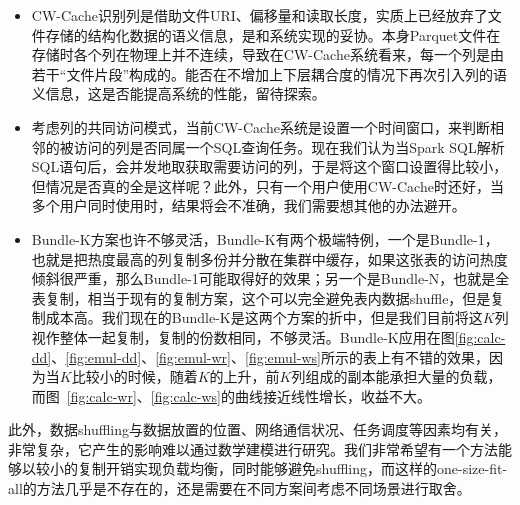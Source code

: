 \begin{itemize}
    \item CW-Cache识别列是借助文件URI、偏移量和读取长度，实质上已经放弃了文件存储的结构化数据的语义信息，是和系统实现的妥协。本身Parquet文件在存储时各个列在物理上并不连续，导致在CW-Cache系统看来，每一个列是由若干“文件片段”构成的。能否在不增加上下层耦合度的情况下再次引入列的语义信息，这是否能提高系统的性能，留待探索。
    \item 考虑列的共同访问模式，当前CW-Cache系统是设置一个时间窗口，来判断相邻的被访问的列是否同属一个SQL查询任务。现在我们认为当Spark SQL解析SQL语句后，会并发地取获取需要访问的列，于是将这个窗口设置得比较小，但情况是否真的全是这样呢？此外，只有一个用户使用CW-Cache时还好，当多个用户同时使用时，结果将会不准确，我们需要想其他的办法避开。
    \item Bundle-K方案也许不够灵活，Bundle-K有两个极端特例，一个是Bundle-1，也就是把热度最高的列复制多份并分散在集群中缓存，如果这张表的访问热度倾斜很严重，那么Bundle-1可能取得好的效果；另一个是Bundle-N，也就是全表复制，相当于现有的复制方案，这个可以完全避免表内数据shuffle，但是复制成本高。我们现在的Bundle-K是这两个方案的折中，但是我们目前将这$K$列视作整体一起复制，复制的份数相同，不够灵活。Bundle-K应用在图\ref{fig:calc-dd}、\ref{fig:emul-dd}、\ref{fig:emul-wr}、\ref{fig:emul-ws}所示的表上有不错的效果，因为当$K$比较小的时候，随着$K$的上升，前$K$列组成的副本能承担大量的负载，而图~\ref{fig:calc-wr}、\ref{fig:calc-ws}的曲线接近线性增长，收益不大。
\end{itemize}

\par 此外，数据shuffling与数据放置的位置、网络通信状况、任务调度等因素均有关，非常复杂，它产生的影响难以通过数学建模进行研究。我们非常希望有一个方法能够以较小的复制开销实现负载均衡，同时能够避免shuffling，而这样的one-size-fit-all的方法几乎是不存在的，还是需要在不同方案间考虑不同场景进行取舍。